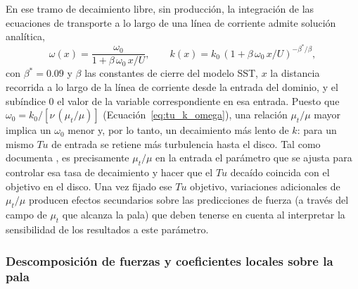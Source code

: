 En ese tramo de decaimiento libre, sin producción, la integración de las ecuaciones de
transporte a lo largo de una línea de corriente admite solución analítica,
%
\begin{equation}
    \omega(x) = \frac{\omega_0}{1 + \beta\,\omega_0\,x/U},
    \qquad
    k(x) = k_0\,\left(1 + \beta\,\omega_0\,x/U\right)^{-\beta^*/\beta},
    \label{eq:tu_decay}
\end{equation}
%
con $\beta^* = 0.09$ y $\beta$ las constantes de cierre del modelo SST, $x$ la distancia recorrida a lo largo de la línea de corriente desde la entrada del dominio, y el subíndice $0$ el valor de la variable correspondiente en esa entrada. Puesto que $\omega_0 = k_0/[\nu\,(\mu_t/\mu)]$
(Ecuación~\ref{eq:tu_k_omega}), una relación $\mu_t/\mu$ mayor implica un $\omega_0$
menor y, por lo tanto, un decaimiento más lento de $k$: para un mismo $Tu$ de entrada se
retiene más turbulencia hasta el disco. Tal como documenta \citet{Baltazar2021}, es
precisamente $\mu_t/\mu$ en la entrada el parámetro que se ajusta para controlar esa
tasa de decaimiento y hacer que el $Tu$ decaído coincida con el objetivo en el disco.
Una vez fijado ese $Tu$ objetivo, variaciones adicionales de $\mu_t/\mu$ producen
efectos secundarios sobre las predicciones de fuerza (a través del campo de $\mu_t$ que
alcanza la pala) que deben tenerse en cuenta al interpretar la sensibilidad de los
resultados a este parámetro.

\subsubsection{Descomposición de fuerzas y coeficientes locales sobre la pala}
\label{sec:metodologia_helices_descomp}

